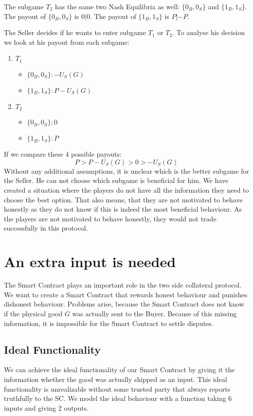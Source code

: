 \documentclass{cacthesis}
\begin{document}
The subgame $T_2$ has the same two Nash Equilibria as well: $\{0_B, 0_S\}$ and $\{1_B, 1_S\}$.\newline
The payout of $\{0_B, 0_S\}$ is $0|0$. The payout of $\{1_B, 1_S\}$ is $P|-P$.\newline

The Seller decides if he wants to enter subgame $T_1$ or $T_2$. To analyse his decision we look at his payout from each subgame:\newline
\begin{enumerate}
    \item $T_1$
        \begin{itemize}
            \item $\{0_B, 0_S\}: -U_S(G)$
            \item $\{1_B, 1_S\}: P-U_S(G)$
        \end{itemize}
    \item $T_2$
        \begin{itemize}
            \item $\{0_B, 0_S\}: 0$
            \item $\{1_B, 1_S\}: P$
        \end{itemize}
\end{enumerate}
If we compare these 4 possible payouts:
\[P > P-U_S(G) > 0 > -U_S(G)\]
Without any additional assumptions, it is unclear which is the better subgame for the Seller. He can not choose which subgame is beneficial for him. \newline
We have created a situation where the players do not have all the information they need to choose the best option. That also means, that they are not motivated to behave honestly as they do not know if this is indeed the most beneficial behaviour. As the players are not motivated to behave honestly, they would not trade successfully in this protocol.

\section{An extra input is needed}
The Smart Contract plays an important role in the two side collateral protocol. We want to create a Smart Contract that rewards honest behaviour and punishes dishonest behaviour.\newline 
Problems arise, because the Smart Contract does not know if the physical good $G$ was actually sent to the Buyer. Because of this missing information, it is impossible for the Smart Contract to settle disputes.
\subsection{Ideal Functionality}
We can achieve the ideal functionality of our Smart Contract by giving it the
information whether the good was actually shipped as an input. This ideal functionality is unrealizable without some trusted party that always reports truthfully to the SC. We model the ideal behaviour with a function taking 6 inputs and giving 2 outputs.\newline
\end{document}
